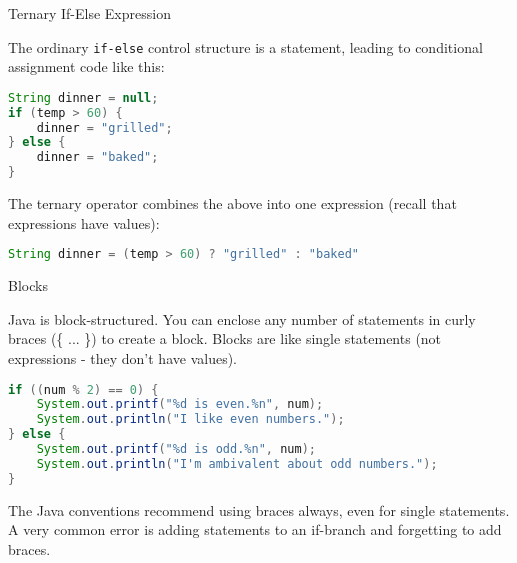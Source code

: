 \documentclass{beamer}
\begin{document}
\begin{frame}[fragile]{Ternary If-Else Expression}


The ordinary {\tt if-else} control structure is a statement, leading
to conditional assignment code like this:
\begin{lstlisting}[language=Java]
String dinner = null;
if (temp > 60) {
    dinner = "grilled";
} else {
    dinner = "baked";
}
\end{lstlisting}

The ternary operator combines the above into one expression (recall
that expressions have values):

\begin{lstlisting}[language=Java]
String dinner = (temp > 60) ? "grilled" : "baked"
\end{lstlisting}

\end{frame}


\begin{frame}[fragile]{Blocks}


Java is block-structured.  You can enclose any number
of statements in curly braces (\{ ... \}) to create a block.  Blocks
are like single statements (not expressions - they don't have values).
\begin{lstlisting}[language=Java]
if ((num % 2) == 0) {
    System.out.printf("%d is even.%n", num);
    System.out.println("I like even numbers.");
} else {
    System.out.printf("%d is odd.%n", num);
    System.out.println("I'm ambivalent about odd numbers.");
}
\end{lstlisting}
The Java conventions recommend using braces always, even for single
statements.  A very common error is adding statements to an if-branch
and forgetting to add braces.

\end{frame}
\end{document}
